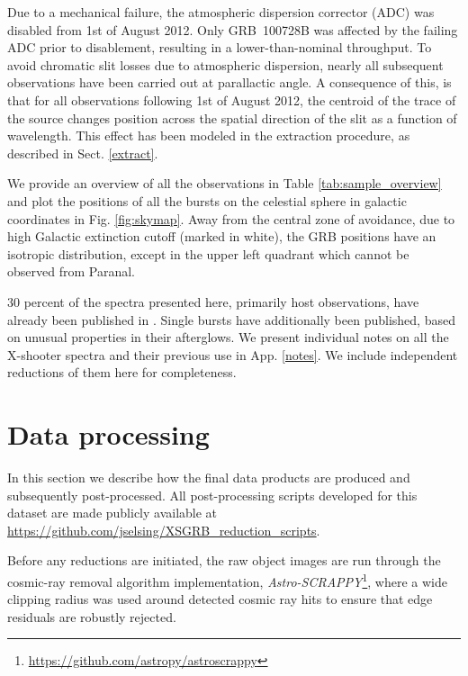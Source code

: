 \documentclass{aa}    %
\begin{document}
Due to a mechanical failure, the atmospheric dispersion corrector (ADC) was
disabled from 1st of August 2012. Only GRB~100728B was affected by the failing
ADC prior to disablement, resulting in a lower-than-nominal throughput. To avoid
chromatic slit losses due to atmospheric dispersion, nearly all subsequent
observations have been carried out at parallactic angle. A consequence of this,
is that for all observations following 1st of August 2012, the centroid of the
trace of the source changes position across the spatial direction of the slit as
a function of wavelength. This effect has been modeled in the extraction
procedure, as described in Sect. \ref{extract}.



We provide an overview of all the observations in Table
\ref{tab:sample_overview} and plot the positions of all the bursts on the
celestial sphere in galactic coordinates in Fig. \ref{fig:skymap}. Away from the
central zone of avoidance, due to high Galactic extinction cutoff (marked in
white), the GRB positions have an isotropic distribution, except in the upper
left quadrant which cannot be observed from Paranal.

30 percent of the spectra presented here, primarily host observations, have
already been published in \citet{Kruhler2015}. Single bursts have additionally
been published, based on unusual properties in their afterglows. We present
individual notes on all the X-shooter spectra and their previous use in App.
\ref{notes}. We include independent reductions of them here for completeness.

\section{Data processing} \label{proc}

In this section we describe how the final data products are produced and
subsequently post-processed. 
All post-processing scripts developed for this dataset are made publicly
available at \url{https://github.com/jselsing/XSGRB_reduction_scripts}.

Before any reductions are initiated, the raw object images are run through the
cosmic-ray removal algorithm \citep{VanDokkum2001} implementation,
\textit{Astro-SCRAPPY}\footnote{\url{https://github.com/astropy/astroscrappy}},
where a wide clipping radius was used around detected cosmic ray hits to ensure
that edge residuals are robustly rejected.
\end{document}
